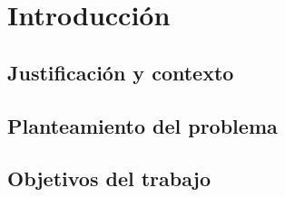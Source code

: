 \newpage{\pagestyle{empty}}
\chapter{Introducción}

\section{Justificación y contexto}

\section{Planteamiento del problema}

\section{Objetivos del trabajo}

